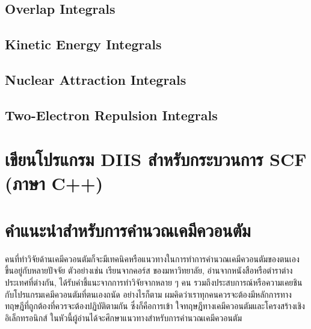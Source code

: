 \subsection{Overlap Integrals}

\subsection{Kinetic Energy Integrals}

\subsection{Nuclear Attraction Integrals}

\subsection{Two-Electron Repulsion Integrals}

\section{เขียนโปรแกรม DIIS สำหรับกระบวนการ SCF (ภาษา C++)}

\section{คำแนะนำสำหรับการคำนวณเคมีควอนตัม}

คนที่ทำวิจัยด้านเคมีควอนตัมก็จะมีเทคนิคหรือแนวทางในการทำการคำนวณเคมีควอนตัมของตนเอง ขึ้นอยู่กับหลายปัจจัย ตัวอย่างเช่น เรียนจากคอร์ส%
ของมหาวิทยาลัย, อ่านจากหนังสือหรือตำราต่างประเทศที่ต่างกัน, ได้รับคำชี้แนะจากการทำวิจัยจากหลาย ๆ คน รวมถึงประสบการณ์หรือความเคยชิน%
กับโปรแกรมเคมีควอนตัมที่ตนเองถนัด อย่างไรก็ตาม ผมคิดว่าเราทุกคนควรจะต้องมีหลักการทางทฤษฎีที่ถูกต้องที่ควรจะต้องปฏิบัติตามกัน ซึ่งก็คือการเข้า%
ใจทฤษฎีทางเคมีควอนตัมและโครงสร้างเชิงอิเล็กทรอนิกส์ ในหัวนี้ผู้อ่านได้จะศึกษาแนวทางสำหรับการคำนวณเคมีควอนตัม

